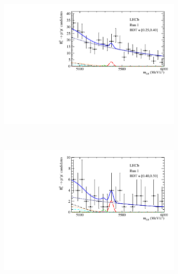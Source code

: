 \begin{figure}[htbp]
    \centering
    \begin{subfigure}[b]{0.48\textwidth}
        \includegraphics[width=\textwidth]{./Figs/BFAnalysis/Bsmumu_Fit_Run1_bin2.pdf}
    \end{subfigure}
    ~ %
    \begin{subfigure}[b]{0.48\textwidth}
       \includegraphics[width=\textwidth]{./Figs/BFAnalysis/Bsmumu_Fit_Run1_bin3.pdf}
    \end{subfigure}
    \begin{subfigure}[b]{0.48\textwidth}

\end{subfigure}
\end{figure}
